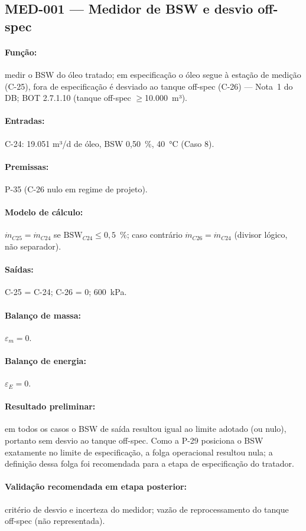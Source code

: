 \documentclass[11pt,a4paper]{article}
\numberwithin{equation}{section}
\numberwithin{table}{section}
\numberwithin{figure}{section}
\begin{document}
\subsection{MED-001 --- Medidor de BSW e desvio off-spec}
\paragraph{Função:} medir o BSW do óleo tratado; em especificação o óleo segue à estação de medição (C-25), fora de especificação é desviado ao tanque off-spec (C-26) --- Nota~1 do DB; BOT 2.7.1.10 (tanque off-spec $\ge$10.000~m³).
\paragraph{Entradas:} C-24: 19.051 m³/d de óleo, BSW 0,50~\%, 40~\si{\celsius} (Caso 8).
\paragraph{Premissas:} P-35 (C-26 nulo em regime de projeto).
\paragraph{Modelo de cálculo:} $\dot m_{C25}=\dot m_{C24}$ se $\mathrm{BSW}_{C24}\le0{,}5$~\%; caso contrário $\dot m_{C26}=\dot m_{C24}$ (divisor lógico, não separador).
\paragraph{Saídas:} C-25 = C-24; C-26 = 0; 600~\si{\kilo\pascal}.
\paragraph{Balanço de massa:} $\varepsilon_m=$$0$.
\paragraph{Balanço de energia:} $\varepsilon_E=$$0$.
\paragraph{Resultado preliminar:} em todos os casos o BSW de saída resultou igual ao limite adotado (ou nulo), portanto sem desvio ao tanque off-spec. Como a P-29 posiciona o BSW exatamente no limite de especificação, a folga operacional resultou nula; a definição dessa folga foi recomendada para a etapa de especificação do tratador.
\paragraph{Validação recomendada em etapa posterior:} critério de desvio e incerteza do medidor; vazão de reprocessamento do tanque off-spec (não representada).
\end{document}
